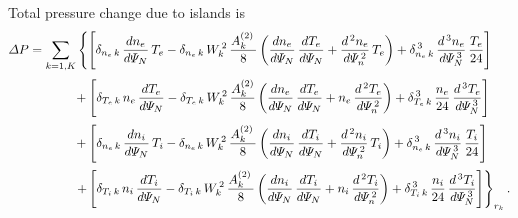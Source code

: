 \documentclass[12pt]{article}
\begin{document}
\newpage
Total pressure change due to islands is 
\begin{align}
{\mit\Delta}P &=\sum_{k=1,K} 
\left\{\left[\delta_{n_e\,k}\,\frac{dn_e}{d{\mit\Psi}_N}\,T_e- \delta_{n_e\,k}\,W_k^{\,2}\,\frac{A_k^{(2)}\,}{8}\left(\frac{dn_e}{d{\mit\Psi}_N}\,\frac{dT_e}{d{\mit\Psi}_N}+\frac{d^{\,2}n_e}{d{\mit\Psi}_n^{\,2}}\,T_e\right)
+ \delta_{n_e\,k}^{\,3}\,\frac{d^{\,3}n_e}{d{\mit\Psi}_N^{\,3}}\,\frac{T_e}{24}\right]\right.
\nonumber\\[0.5ex]
&\phantom{++++}+\left[\delta_{T_e\,k}\,n_e\,\frac{dT_e}{d{\mit\Psi}_N}- \delta_{T_e\,k}\,W_k^{\,2}\,\frac{A_k^{(2)}}{8}\left(\frac{dn_e}{d{\mit\Psi}_N}\,\frac{dT_e}{d{\mit\Psi}_N}+
 n_e\,\frac{d^{\,2}T_e}{d{\mit\Psi}_n^{\,2}}\right)
+ \delta_{T_e\,k}^{\,3}\,\frac{n_e}{24}\,\frac{d^{\,3}T_e}{d{\mit\Psi}_N^{\,3}}\right]\nonumber\\[0.5ex]
&\phantom{++++}+\left[\delta_{n_e\,k}\,\frac{dn_i}{d{\mit\Psi}_N}\,T_i- \delta_{n_e\,k}\,W_k^{\,2}\,\frac{A_k^{(2)}\,}{8}\left(\frac{dn_i}{d{\mit\Psi}_N}\,\frac{dT_i}{d{\mit\Psi}_N}+\frac{d^{\,2}n_i}{d{\mit\Psi}_n^{\,2}}
\,T_i\right)+ \delta_{n_e\,k}^{\,3}\,\frac{d^{\,3}n_i}{d{\mit\Psi}_N^{\,3}}\,\frac{T_i}{24}\right]
\nonumber\\[0.5ex]
&\phantom{++++}\left.+\left[\delta_{T_i\,k}\,n_i\,\frac{dT_i}{d{\mit\Psi}_N}- \delta_{T_i\,k}\,W_k^{\,2}\,\frac{A_k^{(2)}\,}{8}\left(\frac{dn_i}{d{\mit\Psi}_N}\,\frac{dT_i}{d{\mit\Psi}_N}+n_i\,\frac{d^{\,2}T_i}{d{\mit\Psi}_n^{\,2}}\right)
+ \delta_{T_i\,k}^{\,3}\,\frac{n_i}{24}\,\frac{d^{\,3}T_i}{d{\mit\Psi}_N^{\,3}}\right]\right\}_{r_k}.
\end{align}
\end{document}
